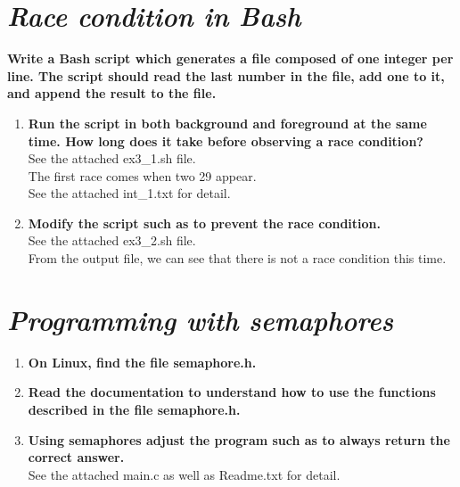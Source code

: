 \documentclass{article}
\begin{document}
\begin{spacing}{1.5}
\section{\textit{Race condition in Bash}}
\textbf{Write a Bash script which generates a file composed of one integer per line. The script should read the last number in the file, add one to it, and append the result to the file.}
\begin{enumerate}
	\item\textbf{Run the script in both background and foreground at the same time. How long does it take before observing a race condition?}\\
	See the attached ex3\_1.sh file.\\
	The first race comes when two 29 appear.\\
	See the attached int\_1.txt for detail.
	\item\textbf{Modify the script such as to prevent the race condition.}
	\\
	See the attached ex3\_2.sh file.\\
	From the output file, we can see that there is not a race condition this time.
\end{enumerate}
\section{\textit{Programming with semaphores}}
\begin{enumerate}
	\item\textbf{On Linux, find the file semaphore.h.}\\
	\item\textbf{Read the documentation to understand how to use the functions described in the file semaphore.h.}\\
	\item\textbf{Using semaphores adjust the program such as to always return the correct answer.}\\
	See the attached main.c as well as Readme.txt for detail.\\
\end{enumerate}
\end{spacing}
\end{document}

